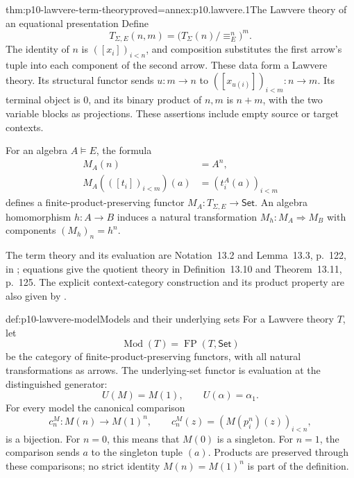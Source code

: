 \begin{hbtheorem}{thm:p10-lawvere-term-theory}{proved=annex:p10.lawvere.1}{The Lawvere theory of an equational presentation}
Define
\[
 T_{\Sigma,E}(n,m)=
             \bigl(T_\Sigma(n)/{\equiv_E^n}\bigr)^m.
\]
The identity of \(n\) is \(([x_i])_{i<n}\), and composition
substitutes the first arrow's tuple into each component of the
second arrow.
These data form a Lawvere theory.
Its structural functor sends \(u:m\to n\) to
\(([x_{u(i)}])_{i<m}:n\to m\).
Its terminal object is \(0\), and its binary product of \(n,m\)
is \(n+m\), with the two variable blocks as projections.
These assertions include empty source or target contexts.

For an algebra \(A\models E\), the formula
\[
 \begin{aligned}
 M_A(n)&=A^n,\\
 M_A(([t_i])_{i<m})(a)&=(t_i^A(a))_{i<m}
 \end{aligned}
\]
defines a finite-product-preserving functor
\(M_A:T_{\Sigma,E}\to\mathsf{Set}\).
An algebra homomorphism \(h:A\to B\) induces a natural
transformation \(M_h:M_A\Rightarrow M_B\) with components
\((M_h)_n=h^n\).
\end{hbtheorem}

The term theory and its evaluation are Notation~13.2 and
Lemma~13.3, p.~122, in
\cite{AdamekRosickyVitale2010Draft}; equations give the quotient
theory in Definition~13.10 and Theorem~13.11, p.~125.
The explicit context-category construction and its product
property are also given by
\cite[Section~4.2, pp.~30--35, especially
Proposition~4.2.1]{Pitts1995Draft}.

\begin{hbdefinition}{def:p10-lawvere-model}{Models and their underlying sets}
For a Lawvere theory \(T\), let
\[
                \operatorname{Mod}(T)
                    =\operatorname{FP}(T,\mathsf{Set})
\]
be the category of finite-product-preserving functors, with all
natural transformations as arrows.
The underlying-set functor is evaluation at the distinguished
generator:
\[
                 U(M)=M(1),\qquad U(\alpha)=\alpha_1.
\]
For every model the canonical comparison
\[
 c_n^M:M(n)\longrightarrow M(1)^n,\qquad
 c_n^M(z)=(M(p_i^n)(z))_{i<n},
\]
is a bijection.  For \(n=0\), this means that \(M(0)\) is
a singleton.  For \(n=1\), the comparison sends \(a\) to the
singleton tuple \((a)\).
Products are preserved through these comparisons; no strict
identity \(M(n)=M(1)^n\) is part of the definition.
\end{hbdefinition}

